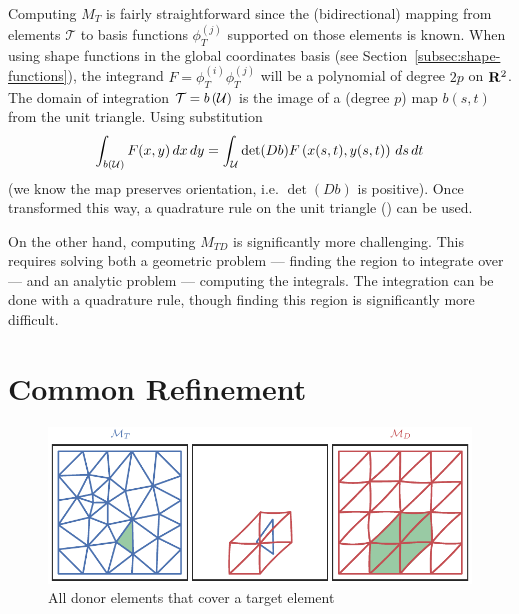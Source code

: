 Computing \(M_T\) is fairly straightforward since the (bidirectional) mapping
from elements \(\mathcal{T}\) to basis functions \(\phi_T^{(j)}\) supported
on those elements is known. When using shape functions in the
global coordinates basis (see Section~\ref{subsec:shape-functions}), the
integrand \(F = \phi_T^{(i)} \phi_T^{(j)}\) will be a polynomial of degree
\(2p\) on \(\mathbf{R}^2\). The domain of integration \(\mathcal{T}
= b\left(\mathcal{U}\right)\) is the image of a (degree \(p\)) map \(b(s, t)\)
from the unit triangle. Using substitution
\begin{equation}\label{eq:mass-mat-subst}
\int_{b\left(\mathcal{U}\right)} F(x, y) \, dx \, dy =
  \int_{\mathcal{U}} \det(Db) F\left(x(s, t), y(s, t)\right) \, ds \, dt
\end{equation}
(we know the map preserves orientation, i.e. \(\det(Db)\) is positive).
Once transformed this way, a quadrature rule on the unit
triangle (\cite{Dunavant1985}) can be used.

On the other hand, computing \(M_{TD}\) is significantly more
challenging. This requires solving both a geometric problem ---
finding the region to integrate over --- and an analytic
problem --- computing the integrals. The integration can be done with
a quadrature rule, though finding this region is significantly
more difficult.

\section{Common Refinement}

\begin{figure}
  \includegraphics{../images/solution-transfer/main_figure02.pdf}
  \centering
  \captionsetup{width=.75\linewidth}
  \caption{All donor elements that cover a target element}
  \label{fig:target-elt-all-matching}
\end{figure}

